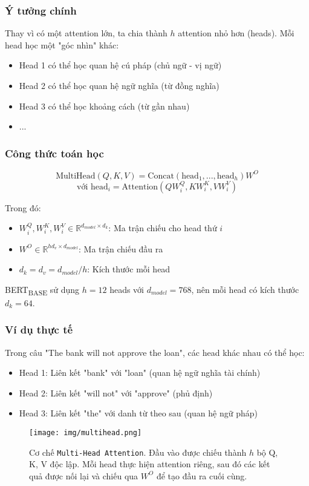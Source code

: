 \subsubsection{Ý tưởng chính}
Thay vì có một attention lớn, ta chia thành $h$ attention nhỏ hơn (heads).
Mỗi head học một "góc nhìn" khác:
\begin{itemize}
    \item Head 1 có thể học quan hệ cú pháp (chủ ngữ - vị ngữ)
    \item Head 2 có thể học quan hệ ngữ nghĩa (từ đồng nghĩa)
    \item Head 3 có thể học khoảng cách (từ gần nhau)
    \item ...
\end{itemize}

\subsubsection{Công thức toán học}
$$ \text{MultiHead}(Q, K, V) = \text{Concat}(\text{head}_1, ..., \text{head}_h)W^O $$
$$ \text{với } \text{head}_i = \text{Attention}(QW_i^Q, KW_i^K, VW_i^V) $$

Trong đó:
\begin{itemize}
    \item $W_i^Q, W_i^K, W_i^V \in \mathbb{R}^{d_{model} \times d_k}$: Ma trận chiếu cho head thứ $i$
    \item $W^O \in \mathbb{R}^{hd_v \times d_{model}}$: Ma trận chiếu đầu ra
    \item $d_k = d_v = d_{model}/h$: Kích thước mỗi head
\end{itemize}

BERT\textsubscript{BASE} sử dụng $h=12$ heads với $d_{model}=768$, nên mỗi head có kích thước $d_k=64$.
\subsubsection{Ví dụ thực tế}
Trong câu "The bank will not approve the loan", các head khác nhau có thể học:
\begin{itemize}
    \item Head 1: Liên kết "bank" với "loan" (quan hệ ngữ nghĩa tài chính)
    \item Head 2: Liên kết "will not" với "approve" (phủ định)
    \item Head 3: Liên kết "the" với danh từ theo sau (quan hệ ngữ pháp)
\end{itemize}

\begin{figure}[H]
    \centering
    \texttt{[image: img/multihead.png]}
    \caption{Cơ chế \texttt{Multi-Head Attention}.
    Đầu vào được chiếu thành $h$ bộ Q, K, V độc lập.
    Mỗi head thực hiện attention riêng, sau đó các kết quả được nối lại và chiếu qua $W^O$ để tạo đầu ra cuối cùng.}
    \label{fig:multi_head_attention}
\end{figure}

